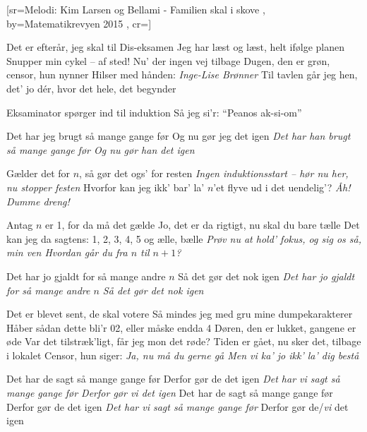 \documentclass[pdftex,12pt]{article}
\begin{document}
\begin{songs}{}
\endverse
\endsong


[sr={Melodi: Kim Larsen og Bellami - Familien skal i skove}
,
by={Matematikrevyen 2015}
,
cr={}]\hypertarget{Induktionssang}{}
\label{song86}

\beginverse
Det er efterår, jeg skal til Dis-eksamen
Jeg har læst og læst, helt ifølge planen
Snupper min cykel – af sted! Nu' der ingen vej tilbage
Dugen, den er grøn, censor, hun nynner
Hilser med hånden:
\emph{Inge-Lise Brønner}
Til tavlen går jeg hen, det' jo dér, hvor det hele, det begynder

\endverse
\beginverse
Eksaminator spørger ind til induktion
Så jeg si'r: ``Peanos ak-si-om''
\endverse

\beginverse
Det har jeg brugt så mange gange før
Og nu gør jeg det igen
\emph{Det har han brugt så mange gange før
Og nu gør han det igen}

\endverse
\beginverse
Gælder det for $n$, så gør det ogs' for resten
\emph{Ingen induktionsstart -- hør nu her, nu stopper festen}
Hvorfor kan jeg ikk' bar' la' $n$'et flyve ud i det uendelig'?
\emph{Åh! Dumme dreng!}

\endverse
\beginverse
Antag $n$ er 1, for da må det gælde
Jo, det er da rigtigt, nu skal du bare tælle
Det kan jeg da sagtens: 1, 2, 3, 4, 5 og ælle, bælle
\emph{Prøv nu at hold' fokus, og sig os så, min ven
Hvordan går du fra $n$ til $n + 1$?}

\endverse
\beginverse
Det har jo gjaldt for så mange andre $n$
Så det gør det nok igen
\emph{Det har jo gjaldt for så mange andre $n$
Så det gør det nok igen}

\endverse
\beginverse
Det er blevet sent, de skal votere
Så mindes jeg med gru mine dumpekarakterer
Håber sådan dette bli'r 02, eller måske endda 4
Døren, den er lukket, gangene er øde
Var det tilstræk'ligt, får jeg mon det røde?
Tiden er gået, nu sker det, tilbage i lokalet
Censor, hun siger:
\emph{Ja, nu må du gerne gå
Men vi ka' jo ikk' la' dig bestå}

\endverse
\beginverse
Det har de sagt så mange gange før
Derfor gør de det igen
\emph{Det har vi sagt så mange gange før
Derfor gør vi det igen}
Det har de sagt så mange gange før
Derfor gør de det igen
\emph{Det har vi sagt så mange gange før}
Derfor gør de/\emph{vi} det igen


\endverse
\endsong




\end{songs}
\end{document}
